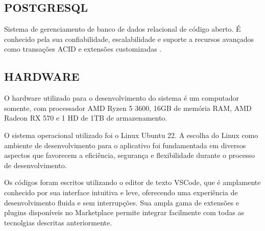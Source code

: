 \subsection{POSTGRESQL}
Sistema de gerenciamento de banco de dados relacional de código aberto. É conhecido pela sua confiabilidade, escalabilidade e suporte a recursos avançados como transações ACID e extensões customizadas \cite{postgresql}.

\subsection{HARDWARE}
O hardware utilizado para o desenvolvimento do sistema é um computador somente, com processador AMD Ryzen 5 3600, 16GB de memória RAM, AMD Radeon RX 570 e 1 HD de 1TB de armazenamento.

O sistema operacional utilizado foi o Linux Ubuntu 22. A escolha do Linux como ambiente de desenvolvimento para o aplicativo foi fundamentada em diversos aspectos que favorecem a eficiência, segurança e flexibilidade durante o processo de desenvolvimento. 

Os códigos foram escritos utilizando o editor de texto VSCode, que é amplamente conhecido por sua interface intuitiva e leve, oferecendo uma experiência de desenvolvimento fluida e sem interrupções. Sua ampla gama de extensões e plugins disponíveis no Marketplace permite integrar facilmente com todas as tecnolgias descritas anteriormente.